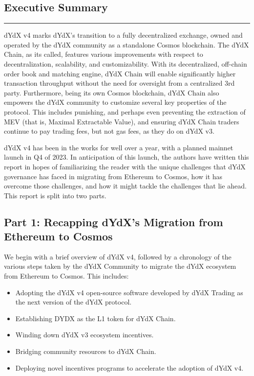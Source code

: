 \begin{fullwidth}
    
    \begin{adjustwidth}{1cm}{1cm}
        \section{Executive Summary} \label{sec:summary}
    
        \textcolor{gray}{\rule{\linewidth}{0.1mm}}
    
        dYdX v4 marks dYdX's transition to a fully decentralized exchange, owned and operated by the dYdX community as a standalone Cosmos blockchain. The dYdX Chain, as its called, features various improvements with respect to decentralization, scalability, and customizability. With its decentralized, off-chain order book and matching engine, dYdX Chain will enable significantly higher transaction throughput without the need for oversight from a centralized 3rd party. Furthermore, being its own Cosmos blockchain, dYdX Chain also empowers the dYdX community to customize several key properties of the protocol. This includes punishing, and perhaps even preventing the extraction of MEV (that is, Maximal Extractable Value), and ensuring dYdX Chain traders continue to pay trading fees, but not gas fees, as they do on dYdX v3.

        dYdX v4 has been in the works for well over a year, with a planned mainnet launch in Q4 of 2023. In anticipation of this launch, the authors have written this report in hopes of familiarizing the reader with the unique challenges that dYdX governance has faced in migrating from Ethereum to Cosmos, how it has overcome those challenges, and how it might tackle the challenges that lie ahead. This report is split into two parts.

        \subsection*{Part 1: Recapping dYdX’s Migration from Ethereum to Cosmos} 
        
        We begin with a brief overview of dYdX v4, followed by a chronology of the various steps taken by the dYdX Community to migrate the dYdX ecosystem from Ethereum to Cosmos. This includes:
        
        \begin{itemize}
            \item Adopting the dYdX v4 open-source software developed by dYdX Trading as the next version of the dYdX protocol.
            \item Establishing DYDX as the L1 token for dYdX Chain.
            \item Winding down dYdX v3 ecosystem incentives.
            \item Bridging community resources to dYdX Chain.
            \item Deploying novel incentives programs to accelerate the adoption of dYdX v4.
        \end{itemize}


\end{adjustwidth}
\end{fullwidth}
